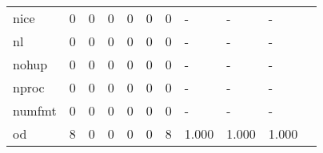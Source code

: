 \begin{longtable}{lp{1.2cm}p{1.2cm}p{1.2cm}p{1.2cm}p{1.2cm}p{1.2cm}p{1.2cm}p{1.2cm}p{1.2cm}p{1.2cm}}
nice      &                                     0 &                                                  0 &                                                  0 &                                                  0 &                                                  0 &                                                  0 &                                             - &                                                  - &                                                  - \\
nl        &                                     0 &                                                  0 &                                                  0 &                                                  0 &                                                  0 &                                                  0 &                                             - &                                                  - &                                                  - \\
nohup     &                                     0 &                                                  0 &                                                  0 &                                                  0 &                                                  0 &                                                  0 &                                             - &                                                  - &                                                  - \\
nproc     &                                     0 &                                                  0 &                                                  0 &                                                  0 &                                                  0 &                                                  0 &                                             - &                                                  - &                                                  - \\
numfmt    &                                     0 &                                                  0 &                                                  0 &                                                  0 &                                                  0 &                                                  0 &                                             - &                                                  - &                                                  - \\
od        &                                     8 &                                                  0 &                                                  0 &                                                  0 &                                                  0 &                                                  8 &                                         1.000 &                                              1.000 &                                              1.000 \\

\end{longtable}
